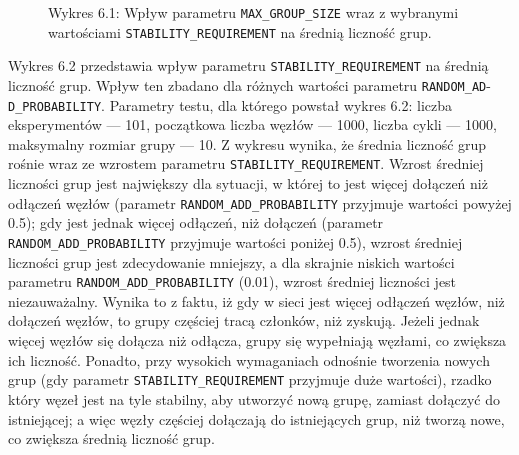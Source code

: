 \documentclass[12pt, twoside, openany]{report}
\begin{document}
\begin{figure}[H]
\captionsetup{labelformat=empty}
\caption{Wykres 6.1: Wpływ parametru \texttt{MAX\_GROUP\_SIZE} wraz z wybranymi wartościami \texttt{STABILITY\_REQUIREMENT} na średnią liczność grup.}
\end{figure}

Wykres 6.2 przedstawia wpływ parametru \texttt{STABILITY\_REQUIREMENT} na średnią liczność grup. Wpływ ten zbadano dla różnych wartości parametru \texttt{RANDOM\_AD}-\texttt{D\_PROBABILITY}. Parametry testu, dla którego powstał wykres 6.2: liczba eksperymentów --- 101, początkowa liczba węzłów --- 1000, liczba cykli --- 1000, maksymalny rozmiar grupy --- 10. Z wykresu wynika, że średnia liczność grup rośnie wraz ze wzrostem parametru \texttt{STABILITY\_REQUIREMENT}. Wzrost średniej liczności grup jest największy dla sytuacji, w której to jest więcej dołączeń niż odłączeń węzłów (parametr \texttt{RANDOM\_ADD\_PROBABILITY} przyjmuje wartości powyżej 0.5); gdy jest jednak więcej odłączeń, niż dołączeń (parametr \texttt{RANDOM\_ADD\_PROBABILITY} przyjmuje wartości poniżej 0.5), wzrost średniej liczności grup jest zdecydowanie mniejszy, a dla skrajnie niskich wartości parametru \texttt{RANDOM\_ADD\_PROBABILITY} (0.01), wzrost średniej liczności jest niezauważalny. Wynika to z faktu, iż gdy w sieci jest więcej odłączeń węzłów, niż dołączeń węzłów, to grupy częściej tracą członków, niż zyskują. Jeżeli jednak więcej węzłów się dołącza niż odłącza, grupy się wypełniają węzłami, co zwiększa ich liczność. Ponadto, przy wysokich wymaganiach odnośnie tworzenia nowych grup (gdy parametr \texttt{STABILITY\_REQUIREMENT} przyjmuje duże wartości), rzadko który węzeł jest na tyle stabilny, aby utworzyć nową grupę, zamiast dołączyć do istniejącej; a więc węzły częściej dołączają do istniejących grup, niż tworzą nowe, co zwiększa średnią liczność grup.
\end{document}

